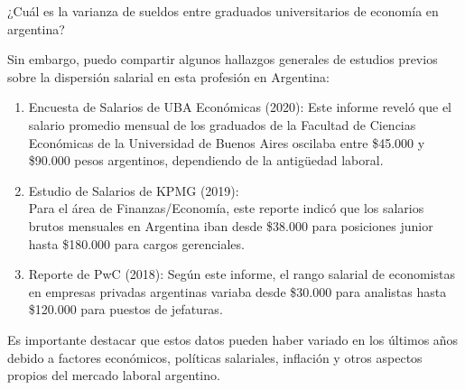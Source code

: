 \documentclass[
]{article}
\begin{document}
¿Cuál es la varianza de sueldos entre graduados universitarios de
economía en argentina?

Sin embargo, puedo compartir algunos hallazgos generales de estudios
previos sobre la dispersión salarial en esta profesión en Argentina:

\begin{enumerate}
\def\labelenumi{\arabic{enumi}.}
\item
  Encuesta de Salarios de UBA Económicas (2020): Este informe reveló que
  el salario promedio mensual de los graduados de la Facultad de
  Ciencias Económicas de la Universidad de Buenos Aires oscilaba entre
  \$45.000 y \$90.000 pesos argentinos, dependiendo de la antigüedad
  laboral.
\item
  Estudio de Salarios de KPMG (2019):\\
  Para el área de Finanzas/Economía, este reporte indicó que los
  salarios brutos mensuales en Argentina iban desde \$38.000 para
  posiciones junior hasta \$180.000 para cargos gerenciales.
\item
  Reporte de PwC (2018): Según este informe, el rango salarial de
  economistas en empresas privadas argentinas variaba desde \$30.000
  para analistas hasta \$120.000 para puestos de jefaturas.
\end{enumerate}

Es importante destacar que estos datos pueden haber variado en los
últimos años debido a factores económicos, políticas salariales,
inflación y otros aspectos propios del mercado laboral argentino.
\end{document}

